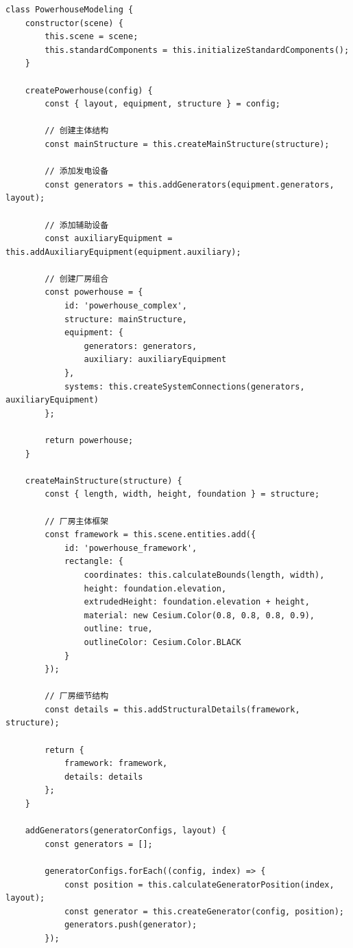 \begin{lstlisting}
class PowerhouseModeling {
    constructor(scene) {
        this.scene = scene;
        this.standardComponents = this.initializeStandardComponents();
    }
    
    createPowerhouse(config) {
        const { layout, equipment, structure } = config;
        
        // 创建主体结构
        const mainStructure = this.createMainStructure(structure);
        
        // 添加发电设备
        const generators = this.addGenerators(equipment.generators, layout);
        
        // 添加辅助设备
        const auxiliaryEquipment = this.addAuxiliaryEquipment(equipment.auxiliary);
        
        // 创建厂房组合
        const powerhouse = {
            id: 'powerhouse_complex',
            structure: mainStructure,
            equipment: {
                generators: generators,
                auxiliary: auxiliaryEquipment
            },
            systems: this.createSystemConnections(generators, auxiliaryEquipment)
        };
        
        return powerhouse;
    }
    
    createMainStructure(structure) {
        const { length, width, height, foundation } = structure;
        
        // 厂房主体框架
        const framework = this.scene.entities.add({
            id: 'powerhouse_framework',
            rectangle: {
                coordinates: this.calculateBounds(length, width),
                height: foundation.elevation,
                extrudedHeight: foundation.elevation + height,
                material: new Cesium.Color(0.8, 0.8, 0.8, 0.9),
                outline: true,
                outlineColor: Cesium.Color.BLACK
            }
        });
        
        // 厂房细节结构
        const details = this.addStructuralDetails(framework, structure);
        
        return {
            framework: framework,
            details: details
        };
    }
    
    addGenerators(generatorConfigs, layout) {
        const generators = [];
        
        generatorConfigs.forEach((config, index) => {
            const position = this.calculateGeneratorPosition(index, layout);
            const generator = this.createGenerator(config, position);
            generators.push(generator);
        });
        

\end{lstlisting}
